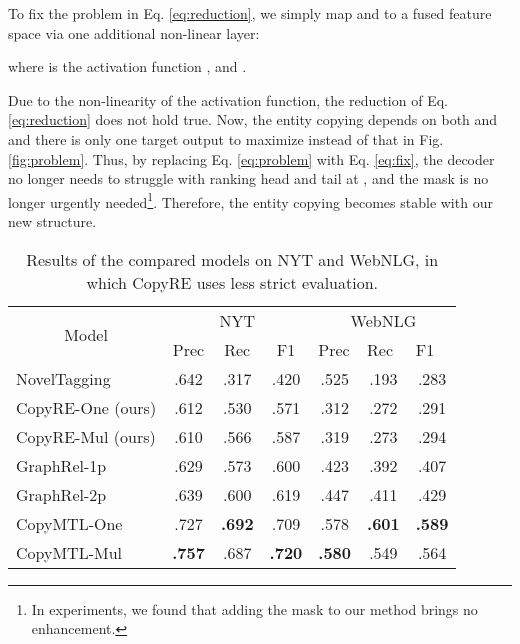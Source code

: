 \documentclass[letterpaper]{article} \usepackage{aaai20}  \usepackage{times}  \usepackage{helvet} \usepackage{courier}  \usepackage[hyphens]{url}  \usepackage{graphicx}
\begin{document}
  
  To fix the problem in Eq. \eqref{eq:reduction}, we simply map  and  to a fused feature space via one additional non-linear layer:
  
  
  where  is the  activation function \cite{selu},  and . 
  
  Due to the non-linearity of the activation function, the reduction of Eq. \eqref{eq:reduction} does not hold true. 
  Now, the entity copying depends on both  and  and there is only one target output to maximize instead of that in Fig. \ref{fig:problem}. 
  Thus, by replacing Eq. \eqref{eq:problem} with Eq. \eqref{eq:fix}, the decoder no longer needs to struggle with ranking head and tail at , and the mask is no longer urgently needed\footnote{In experiments, we found that adding the mask to our method brings no enhancement.}. 
  Therefore, the entity copying becomes stable with our new structure. 



\begin{table*}[t]
  \centering
\begin{tabular}{cccc|ccc}
  \hline
  \multicolumn{1}{c|}{\multirow{2}{*}{Model}} & \multicolumn{3}{c|}{NYT} & \multicolumn{3}{c}{WebNLG} \\ \cline{2-7} 
  \multicolumn{1}{c|}{} & Prec & Rec & F1 & \multicolumn{1}{l}{Prec} & \multicolumn{1}{l}{Rec} & \multicolumn{1}{l}{F1} \\ \hline
  \multicolumn{1}{l|}{NovelTagging} & .642 & .317 & .420 & .525 & .193 & .283 \\
\multicolumn{1}{l|}{CopyRE-One (ours)} & .612 & .530 & .571 & .312 & .272 & .291 \\
  \multicolumn{1}{l|}{CopyRE-Mul (ours)} & .610 & .566 & .587 & .319 & .273 & .294 \\

\multicolumn{1}{l|}{GraphRel-1p} & .629 & .573 & .600 & .423 & .392 & .407 \\
  \multicolumn{1}{l|}{GraphRel-2p} & .639 & .600 & .619 & .447 & .411 & .429 \\
  \multicolumn{1}{l|}{CopyMTL-One} & .727 & \textbf{.692} & .709 & {.578} & \textbf{.601} & \textbf{.589} \\
  \multicolumn{1}{l|}{CopyMTL-Mul} & \textbf{.757} & {.687} & \textbf{.720} & \textbf{.580} & .549 & .564 \\ \hline
  \end{tabular}
\caption{Results of the compared models on NYT and WebNLG, in which CopyRE uses less strict evaluation.}
  \label{tab:main_result}
  
  \end{table*}
\end{document}
